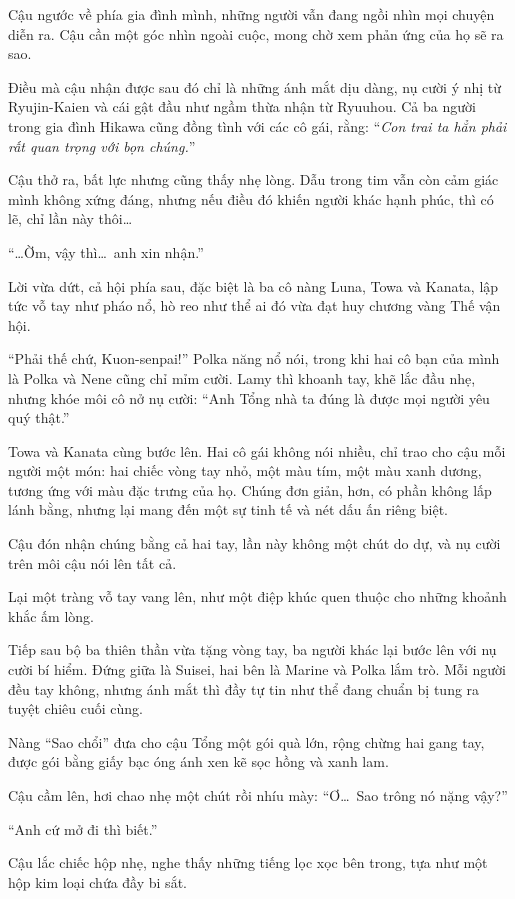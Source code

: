 \documentclass[../main.tex]{subfiles}
\begin{document}
Cậu ngước về phía gia đình mình, những người vẫn đang ngồi nhìn mọi chuyện diễn ra. Cậu cần một góc nhìn ngoài cuộc, mong chờ xem phản ứng của họ sẽ ra sao.

Điều mà cậu nhận được sau đó chỉ là những ánh mắt dịu dàng, nụ cười ý nhị từ Ryujin-Kaien và cái gật đầu như ngầm thừa nhận từ Ryuuhou. Cả ba người trong gia đình Hikawa cũng đồng tình với các cô gái, rằng: ``\textit{Con trai ta hẳn phải rất quan trọng với bọn chúng.}''

Cậu thở ra, bất lực nhưng cũng thấy nhẹ lòng. Dẫu trong tim vẫn còn cảm giác mình không xứng đáng, nhưng nếu điều đó khiến người khác hạnh phúc, thì có lẽ, chỉ lần này thôi\dots

``\dots Ờm, vậy thì\dots\ anh xin nhận.''

Lời vừa dứt, cả hội phía sau, đặc biệt là ba cô nàng Luna, Towa và Kanata, lập tức vỗ tay như pháo nổ, hò reo như thể ai đó vừa đạt huy chương vàng Thế vận hội.

``Phải thế chứ, Kuon-senpai!'' Polka năng nổ nói, trong khi hai cô bạn của mình là Polka và Nene cũng chỉ mỉm cười. Lamy thì khoanh tay, khẽ lắc đầu nhẹ, nhưng khóe môi cô nở nụ cười: ``Anh Tổng nhà ta đúng là được mọi người yêu quý thật.''

Towa và Kanata cùng bước lên. Hai cô gái không nói nhiều, chỉ trao cho cậu mỗi người một món: hai chiếc vòng tay nhỏ, một màu tím, một màu xanh dương, tương ứng với màu đặc trưng của họ. Chúng đơn giản, hơn, có phần không lấp lánh bằng, nhưng lại mang đến một sự tinh tế và nét dấu ấn riêng biệt.

Cậu đón nhận chúng bằng cả hai tay, lần này không một chút do dự, và nụ cười trên môi cậu nói lên tất cả.

Lại một tràng vỗ tay vang lên, như một điệp khúc quen thuộc cho những khoảnh khắc ấm lòng.

Tiếp sau bộ ba thiên thần vừa tặng vòng tay, ba người khác lại bước lên với nụ cười bí hiểm. Đứng giữa là Suisei, hai bên là Marine và Polka lắm trò. Mỗi người đều tay không, nhưng ánh mắt thì đầy tự tin như thể đang chuẩn bị tung ra tuyệt chiêu cuối cùng.

Nàng ``Sao chổi'' đưa cho cậu Tổng một gói quà lớn, rộng chừng hai gang tay, được gói bằng giấy bạc óng ánh xen kẽ sọc hồng và xanh lam.

Cậu cầm lên, hơi chao nhẹ một chút rồi nhíu mày: ``Ơ\dots\ Sao trông nó nặng vậy?''

``Anh cứ mở đi thì biết.''

Cậu lắc chiếc hộp nhẹ, nghe thấy những tiếng lọc xọc bên trong, tựa như một hộp kim loại chứa đầy bi sắt.
\end{document}
